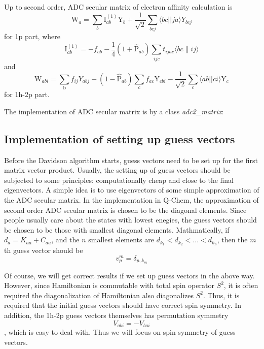 \documentclass[bachelor, english]{ustcthesis}
\begin{document}
Up to second order, ADC secular matrix of electron affinity calculation is
\begin{equation}
	\mathrm{W}_{a}=\sum_{b} \mathrm{I}_{a b}^{(1)} \mathrm{Y}_{b}+\frac{1}{\sqrt{2}} \sum_{b c j}\langle b c| | j a\rangle Y_{b c j}
\end{equation}
for 1p part, where
\begin{equation}
\mathrm{I}_{a b}^{(1)}=-f_{a b}-\frac{1}{4}\left(1+\hat{\mathrm{P}}_{a b}\right) \sum_{i j c} t_{i j a c}\langle b c \| i j\rangle
\end{equation}
and
\begin{equation}
	\mathrm{W}_{a b i}=\sum_{\mathrm{b}} f_{i j} Y_{a b j}-\left(1-\hat{\mathrm{P}}_{a b}\right) \sum_{c} f_{a c} \mathrm{Y}_{c b i}-\frac{1}{\sqrt{2}} \sum_{c}\langle a b| | c i\rangle \mathrm{Y}_{c}
\end{equation}
for 1h-2p part.

The implementation of ADC secular matrix is by a class \emph{adc2\_matrix}:



\subsection{Implementation of setting up guess vectors}

Before the Davidson algorithm starts, guess vectors need to be set up for the first matrix vector product.
Usually, the setting up of guess vectors should be subjected to some principles: computationally cheap and close to the final eigenvectors.
A simple idea is to use eigenvectors of some simple approximation of the ADC secular matrix.
In the implementation in Q-Chem, the approximation of second order ADC secular matrix is chosen to be the diagonal elements.
Since people usually care about the states with lowest enegies, the guess vectors should be chosen to be those with smallest diagonal elements.
Mathmatically, if $d_a=K_{aa}+C_{aa}$, and the $n$ smallest elements are $d_{k_1}<d_{k_2}< \dots <d_{k_n}$, then the $m$th guess vector should be 
\begin{equation}
	v^m_p=\delta_{p, k_m}
\end{equation}

Of course, we will get correct results if we set up guess vectors in the above way.
However, since Hamiltonian is commutable with total spin operator $S^2$, it is often required the diagonalization of Hamiltonian also diagonalizes $S^2$.
Thus, it is required that the initial guess vectors should have correct spin symmetry.
In addition, the 1h-2p guess vectors themselves has permutation symmetry
\begin{equation}
	V_{abi}=-V_{bai}
\end{equation}
, which is easy to deal with. Thus we will focus on spin symmetry of guess vectors.
\end{document}
